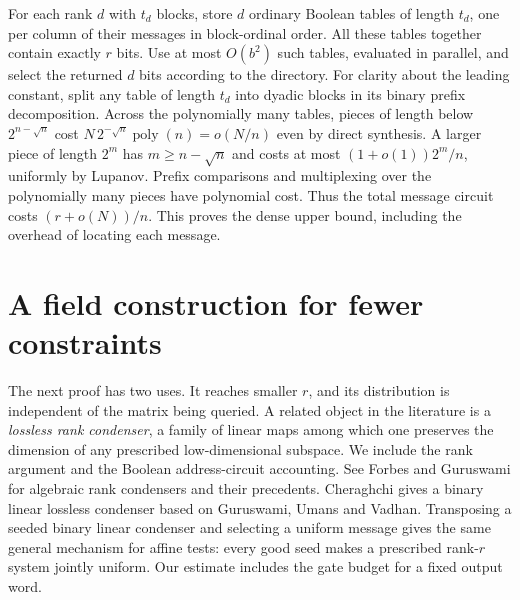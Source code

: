\documentclass[11pt]{article}
\begin{document}
For each rank $d$ with $t_d$ blocks, store $d$ ordinary Boolean tables of length $t_d$, one per column of their messages in block-ordinal order. All these tables together contain exactly $r$ bits. Use at most $O(b^2)$ such tables, evaluated in parallel, and select the returned $d$ bits according to the directory. For clarity about the leading constant, split any table of length $t_d$ into dyadic blocks in its binary prefix decomposition. Across the polynomially many tables, pieces of length below $2^{n-\sqrt n}$ cost $N\,2^{-\sqrt n}\operatorname{poly}(n)=o(N/n)$ even by direct synthesis. A larger piece of length $2^m$ has $m\ge n-\sqrt n$ and costs at most $(1+o(1))2^m/n$, uniformly by Lupanov. Prefix comparisons and multiplexing over the polynomially many pieces have polynomial cost. Thus the total message circuit costs $(r+o(N))/n$. This proves the dense upper bound, including the overhead of locating each message.

\section{A field construction for fewer constraints}
The next proof has two uses. It reaches smaller $r$, and its distribution is independent of the matrix being queried. A related object in the literature is a \emph{lossless rank condenser}, a family of linear maps among which one preserves the dimension of any prescribed low-dimensional subspace. We include the rank argument and the Boolean address-circuit accounting. See Forbes and Guruswami \cite{fg} for algebraic rank condensers and their precedents. Cheraghchi \cite[Corollary 2.23]{cher} gives a binary linear lossless condenser based on Guruswami, Umans and Vadhan. Transposing a seeded binary linear condenser and selecting a uniform message gives the same general mechanism for affine tests: every good seed makes a prescribed rank-$r$ system jointly uniform. Our estimate includes the gate budget for a fixed output word.
\end{document}
